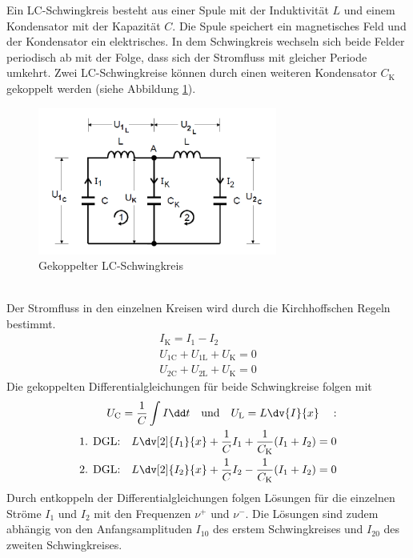 Ein LC-Schwingkreis besteht aus einer Spule mit der Induktivität $L$ und einem Kondensator mit der Kapazität $C$. Die Spule speichert ein magnetisches Feld 
und der Kondensator ein elektrisches. In dem Schwingkreis wechseln sich beide Felder periodisch ab mit der Folge, dass sich der Stromfluss  mit gleicher Periode umkehrt. Zwei LC-Schwingkreise können durch einen weiteren Kondensator $C_\text{K}$ gekoppelt werden (siehe Abbildung \ref{fig:Abb2}).
\begin{figure}[h!]
	\centering
	\includegraphics[width=0.7\textwidth]{Abb2.png}
	\caption{Gekoppelter LC-Schwingkreis}
	\label{fig:Abb2}
\end{figure} \\
Der Stromfluss in den einzelnen Kreisen wird durch die Kirchhoffschen Regeln bestimmt.
\begin{align}
I_\text{K} = I_\text{1}-I_\text{2} \\
U_\text{1C} + U_\text{1L} + U_\text{K} = 0 \\
U_\text{2C} + U_\text{2L} + U_\text{K} = 0
\end{align}
Die gekoppelten Differentialgleichungen für beide Schwingkreise folgen mit
\begin{align}
U_\text{C} = \frac{1}{C} \int I \dd t \quad \text{und} \quad U_\text{L} = L \dv{I}{x} \quad :  \\
\text{1. DGL:} \quad L \dv[2]{I_1}{x} + \frac{1}{C} I_1 + \frac{1}{C_\text{K}}(I_1 + I_2) = 0 \\
\text{2. DGL:} \quad L \dv[2]{I_2}{x} + \frac{1}{C} I_2 - \frac{1}{C_\text{K}} (I_1 + I_2) = 0
\end{align}
Durch entkoppeln der Differentialgleichungen folgen Lösungen für die einzelnen Ströme $I_1$ und $I_2$ mit den Frequenzen $\nu^+$ und $\nu^-$. Die Lösungen sind zudem abhängig von den Anfangsamplituden $I_{10}$ des erstem Schwingkreises und $I_{20}$ des zweiten Schwingkreises.
